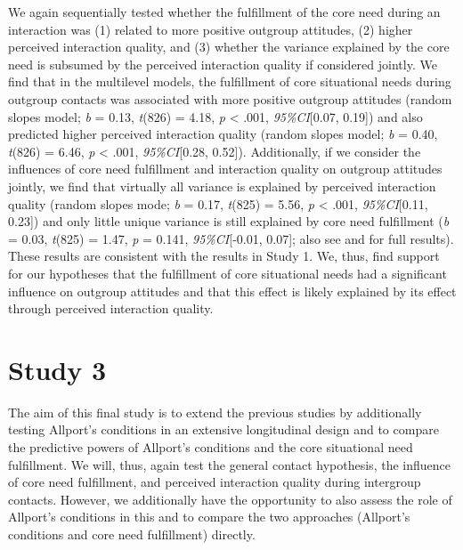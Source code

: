 We again sequentially tested whether the fulfillment of the core need
during an interaction was (1) related to more positive outgroup
attitudes, (2) higher perceived interaction quality, and (3) whether the
variance explained by the core need is subsumed by the perceived
interaction quality if considered jointly. We find that in the
multilevel models, the fulfillment of core situational needs during
outgroup contacts was associated with more positive outgroup attitudes
(random slopes model; \textit{b} = 0.13, \textit{t}(826) = 4.18,
\textit{p} \textless{} .001, \textit{95\%CI}{[}0.07, 0.19{]}) and also
predicted higher perceived interaction quality (random slopes model;
\textit{b} = 0.40, \textit{t}(826) = 6.46, \textit{p} \textless{} .001,
\textit{95\%CI}{[}0.28, 0.52{]}). Additionally, if we consider the
influences of core need fulfillment and interaction quality on outgroup
attitudes jointly, we find that virtually all variance is explained by
perceived interaction quality (random slopes mode; \textit{b} = 0.17,
\textit{t}(825) = 5.56, \textit{p} \textless{} .001,
\textit{95\%CI}{[}0.11, 0.23{]}) and only little unique variance is
still explained by core need fulfillment (\textit{b} = 0.03,
\textit{t}(825) = 1.47, \textit{p} = 0.141, \textit{95\%CI}{[}-0.01,
0.07{]}; also see  and
 for full results). These results are
consistent with the results in Study 1. We, thus, find support for our
hypotheses that the fulfillment of core situational needs had a
significant influence on outgroup attitudes and that this effect is
likely explained by its effect through perceived interaction quality.

\section{Study 3}

The aim of this final study is to extend the previous studies by
additionally testing Allport's conditions in an extensive longitudinal
design and to compare the predictive powers of Allport's conditions and
the core situational need fulfillment. We will, thus, again test the
general contact hypothesis, the influence of core need fulfillment, and
perceived interaction quality during intergroup contacts. However, we
additionally have the opportunity to also assess the role of Allport's
conditions in this and to compare the two approaches (Allport's
conditions and core need fulfillment) directly.

